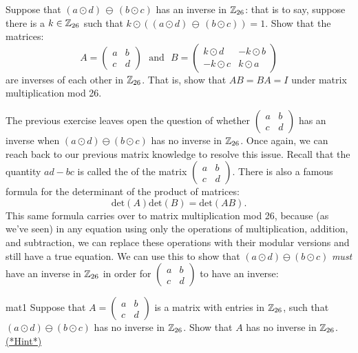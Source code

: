 \begin{exercise}{}
Suppose that $(a \odot d) \, \ominus \, (b \odot c)$ has an inverse in ${\Bbb Z}_{26}$: that is to say, suppose there is a $k \in  {\Bbb Z}_{26}$ such that $k \odot ((a \odot d) \, \ominus \, (b \odot c)) = 1$.  Show that the matrices:
$$
A = \left( \begin{array}{cc} a & b \\ c & d \end{array} \right)~~~\text{and}~~~
B=
\left( \begin{array}{cc}  k \odot d & - k \odot b \\ - k \odot c &  k \odot a \end{array} \right)$$
are inverses of each other  in ${\Bbb Z}_{26}$.  That is, show that $AB = BA = I$ under matrix multiplication mod 26.

\end{exercise} 
The previous exercise leaves open the question of whether $\left( \begin{array}{cc} a & b \\ c & d \end{array} \right)$ has an inverse when $(a \odot d)  \ominus (b \odot c)$ has no inverse in ${\Bbb Z}_{26}$. Once again, we can reach back to our previous matrix knowledge to resolve this issue. Recall that the quantity $ad - bc$ is called the  of the matrix  $\left( \begin{array}{cc} a & b \\ c & d \end{array} \right)$.  There is also a famous formula for the determinant of the product of matrices:
$$\text{det}(A) \text{det}(B) = \text{det}(AB).$$
This same formula carries over to matrix multiplication mod 26, because (as we've seen) in any equation using only the operations of multiplication, addition, and subtraction, we can replace these operations with their modular versions and still have a true equation. We can use this to show that $(a \odot d)  \ominus (b \odot c)$ \emph{must} have an inverse in ${\Bbb Z}_{26}$ in order for $\left( \begin{array}{cc} a & b \\ c & d \end{array} \right)$ to have an inverse:

\begin{exercise}{mat1}
Suppose that $A = \left( \begin{array}{cc} a & b \\ c & d \end{array} \right)$ is a matrix with entries in ${\Bbb Z}_{26}$, such that  $(a \odot d)  \ominus (b \odot c)$ has no inverse in ${\Bbb Z}_{26}$. Show that $A$ has no inverse in  ${\Bbb Z}_{26}$.
\hyperref[sec:crypt:hints]{(*Hint*)}
\end{exercise}


